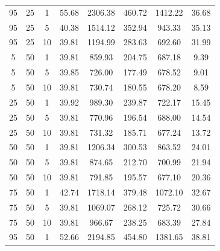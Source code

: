 \begin{table}[H]
\begin{tabular}{ccc|c|c|c|c|c}
95 & 25 & 1 & \cellcolor{gray!1}55.68 & \cellcolor{gray!1}2306.38 & \cellcolor{gray!1}460.72 & \cellcolor{gray!1}1412.22 & 36.68\\
95 & 25 & 5 & \cellcolor{gray!45}40.38 & \cellcolor{gray!1}1514.12 & \cellcolor{gray!1}352.94 & \cellcolor{gray!1}943.33 & 35.13\\
95 & 25 & 10 & \cellcolor{gray!50}39.81 & \cellcolor{gray!1}1194.99 & \cellcolor{gray!1}283.63 & \cellcolor{gray!40}692.60 & 31.99\\
5 & 50 & 1 & \cellcolor{gray!50}39.81 & \cellcolor{gray!28}859.93 & \cellcolor{gray!24}204.75 & \cellcolor{gray!42}687.18 & 9.39\\
5 & 50 & 5 & \cellcolor{gray!50}39.85 & \cellcolor{gray!50}726.00 & \cellcolor{gray!50}177.49 & \cellcolor{gray!45}678.52 & 9.01\\
5 & 50 & 10 & \cellcolor{gray!50}39.81 & \cellcolor{gray!50}730.74 & \cellcolor{gray!47}180.55 & \cellcolor{gray!45}678.20 & 8.59\\
25 & 50 & 1 & \cellcolor{gray!49}39.92 & \cellcolor{gray!7}989.30 & \cellcolor{gray!1}239.87 & \cellcolor{gray!31}722.17 & 15.45\\
25 & 50 & 5 & \cellcolor{gray!50}39.81 & \cellcolor{gray!43}770.96 & \cellcolor{gray!32}196.54 & \cellcolor{gray!42}688.00 & 14.54\\
25 & 50 & 10 & \cellcolor{gray!50}39.81 & \cellcolor{gray!50}731.32 & \cellcolor{gray!42}185.71 & \cellcolor{gray!45}677.24 & 13.72\\
50 & 50 & 1 & \cellcolor{gray!50}39.81 & \cellcolor{gray!1}1206.34 & \cellcolor{gray!1}300.53 & \cellcolor{gray!1}863.52 & 24.01\\
50 & 50 & 5 & \cellcolor{gray!50}39.81 & \cellcolor{gray!26}874.65 & \cellcolor{gray!17}212.70 & \cellcolor{gray!38}700.99 & 21.94\\
50 & 50 & 10 & \cellcolor{gray!50}39.81 & \cellcolor{gray!40}791.85 & \cellcolor{gray!33}195.57 & \cellcolor{gray!45}677.10 & 20.36\\
75 & 50 & 1 & \cellcolor{gray!21}42.74 & \cellcolor{gray!1}1718.14 & \cellcolor{gray!1}379.48 & \cellcolor{gray!1}1072.10 & 32.67\\
75 & 50 & 5 & \cellcolor{gray!50}39.81 & \cellcolor{gray!1}1069.07 & \cellcolor{gray!1}268.12 & \cellcolor{gray!30}725.72 & 30.66\\
75 & 50 & 10 & \cellcolor{gray!50}39.81 & \cellcolor{gray!10}966.67 & \cellcolor{gray!1}238.25 & \cellcolor{gray!43}683.39 & 27.84\\
95 & 50 & 1 & \cellcolor{gray!1}52.66 & \cellcolor{gray!1}2194.85 & \cellcolor{gray!1}454.80 & \cellcolor{gray!1}1381.65 & 38.81\\

\end{tabular}
\end{table}
